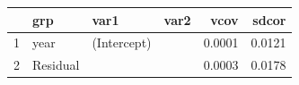 \begin{table}[ht]
\centering
\begin{tabular}{rlllrr}
  \hline
 & grp & var1 & var2 & vcov & sdcor \\ 
  \hline
1 & year & (Intercept) &  & 0.0001 & 0.0121 \\ 
  2 & Residual &  &  & 0.0003 & 0.0178 \\ 
   \hline
\end{tabular}
\end{table}
